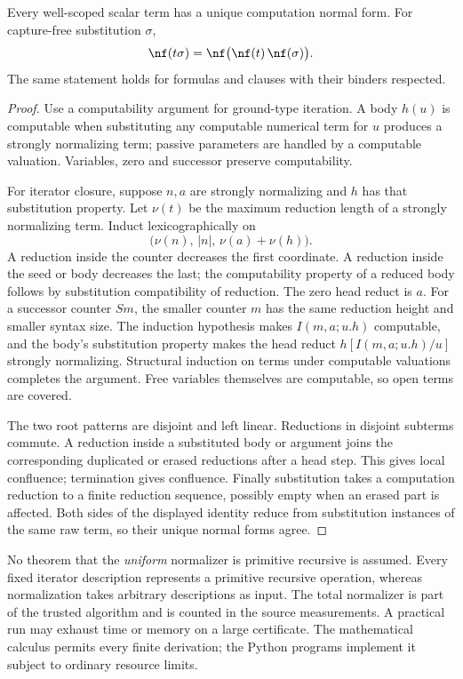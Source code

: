 \begin{lemma}
Every well-scoped scalar term has a unique computation normal form.
For capture-free substitution $\sigma$,
\[
 \nf(t\sigma)=\nf\bigl(\nf(t)\,\nf(\sigma)\bigr).
\]
The same statement holds for formulas and clauses with their binders respected.
\end{lemma}
\begin{proof}
Use a computability argument for ground-type iteration.
A body $h(u)$ is computable when substituting any computable numerical
term for $u$ produces a strongly normalizing term; passive parameters
are handled by a computable valuation. Variables, zero and successor
preserve computability.

For iterator closure, suppose $n,a$ are strongly normalizing and
$h$ has that substitution property. Let $\nu(t)$ be the maximum
reduction length of a strongly normalizing term. Induct lexicographically on
\[
 \bigl(\nu(n),\,|n|,\,\nu(a)+\nu(h)\bigr).
\]
A reduction inside the counter decreases the first coordinate.
A reduction inside the seed or body decreases the last; the computability
property of a reduced body follows by substitution compatibility of reduction.
The zero head reduct is $a$. For a successor counter $Sm$, the smaller
counter $m$ has the same reduction height and smaller syntax size.
The induction hypothesis makes $I(m,a;u.h)$ computable, and the body's
substitution property makes the head reduct
$h[I(m,a;u.h)/u]$ strongly normalizing.
Structural induction on terms under computable valuations completes the
argument. Free variables themselves are computable, so open terms are covered.

The two root patterns are disjoint and left linear. Reductions in disjoint
subterms commute. A reduction inside a substituted body or argument joins
the corresponding duplicated or erased reductions after a head step.
This gives local confluence; termination gives confluence.
Finally substitution takes a computation reduction to a finite reduction
sequence, possibly empty when an erased part is affected. Both sides of the
displayed identity reduce from substitution instances of the same raw term,
so their unique normal forms agree.
\end{proof}

No theorem that the \emph{uniform} normalizer is primitive recursive is
assumed. Every fixed iterator description represents a primitive recursive
operation, whereas normalization takes arbitrary descriptions as input.
The total normalizer is part of the trusted algorithm and is counted in the
source measurements. A practical run may exhaust time or memory on a large
certificate. The mathematical calculus permits every finite derivation;
the Python programs implement it subject to ordinary resource limits.


